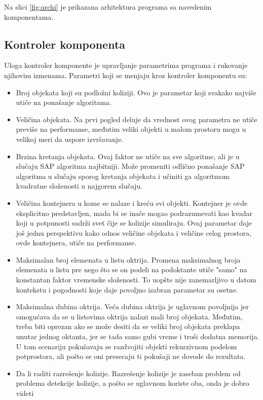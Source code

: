 \documentclass[12pt,oneside]{memoir}
\begin{document}
Na slici \ref{fig:archi} je prikazana arhitektura programa sa navedenim komponentama.

\subsection{Kontroler komponenta}

Uloga kontroler komponente je upravljanje parametrima programa i rukovanje njihovim izmenama.
Parametri koji se menjaju kroz kontroler komponentu su: 
\begin{itemize}  
	\item Broj objekata koji su podložni koliziji. 
	Ovo je parametar koji svakako najviše utiče na ponašanje algoritama.
	\item Veličina objekata. 
	Na prvi pogled deluje da vrednost ovog parametra ne utiče previše na performanse, međutim veliki objekti u malom prostoru mogu u velikoj meri da uspore izvršavanje.
	\item Brzina kretanja objekata.
	Ovaj faktor ne utiče na sve algoritme, ali je u slučaju SAP algoritma najbitniji. Može promeniti odlično ponašanje SAP algoritma u slučaju sporog kretanja 
	objekata i učiniti ga algoritmom kvadratne složenosti u najgorem slučaju.
	\item Veličina kontejnera u kome se nalaze i kreću svi objekti. Kontejner je ovde eksplicitno predstavljen, mada bi se inače mogao podrazumevati kao kvadar 
	koji u potpunosti sadrži svet čije se kolizije simuliraju.
	Ovaj parametar daje još jednu perspektivu kako odnos veličine objekata i veličine celog prostora, ovde kontejnera, utiče na performanse.
	\item Maksimalan broj elemenata u listu oktrija.
	Promena maksimalnog broja elemenata u listu pre nego što se on podeli na podoktante utiče "samo" na konstantan faktor vremenske složenosti.
	To uopšte nije zanemarljivo u datom kontekstu i pogodnosti koje daje povoljno izabran parametar su osetne.
	\item Maksimalna dubina oktrija. Veća dubina oktrija je uglavnom povoljnija jer omogućava da se u listovima oktrija nalazi mali broj objekata.
	Međutim, treba biti oprezan ako se može desiti 
	da se veliki broj objekata preklapa unutar jednog oktanta, jer se tada samo gubi vreme i troši dodatna memorija. 
	U tom scenariju pokušavaju se razdvojiti objekti rekurzivnom podelom potprostora, ali pošto se oni presecaju ti pokušaji ne dovode do rezultata.
	\item Da li raditi razrešenje kolizije. 
	Razrešenje kolizije je zaseban problem od problema detekcije kolizije, a pošto se uglavnom koriste oba, onda je dobro videti 

\end{itemize}
\end{document}
